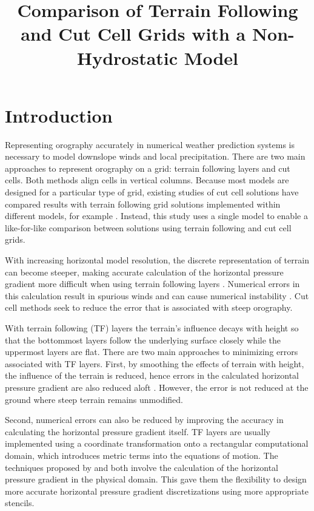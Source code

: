 \documentclass[twocol]{ametsoc}
\title{Comparison of Terrain Following and Cut Cell Grids with a Non-Hydrostatic Model}
\affiliation{}
\begin{document}
\newcommand{\TODO}[1]{\textcolor{purple}{TODO: \emph{#1}}}

\maketitle

\section{Introduction}
Representing orography accurately in numerical weather prediction systems is necessary to model downslope winds and local precipitation.  There are two main approaches to represent orography on a grid: terrain following layers and cut cells.  Both methods align cells in vertical columns.  Because most models are designed for a particular type of grid, existing studies of cut cell solutions have compared results with terrain following grid solutions implemented within different models, for example \citet{good2014}.  Instead, this study uses a single model to enable a like-for-like comparison between solutions using terrain following and cut cell grids.

With increasing horizontal model resolution, the discrete representation of terrain can become steeper, making accurate calculation of the horizontal pressure gradient more difficult when using terrain following layers \citep{gary1973,steppeler2002}.  Numerical errors in this calculation result in spurious winds and can cause numerical instability \citep{fast2003,webster2003}.  Cut cell methods seek to reduce the error that is associated with steep orography.

With terrain following (TF) layers the terrain's influence decays with height so that the bottommost layers follow the underlying surface closely while the uppermost layers are flat.  There are two main approaches to minimizing errors associated with TF layers.  First, by smoothing the effects of terrain with height, the influence of the terrain is reduced, hence errors in the calculated horizontal pressure gradient are also reduced aloft \citep{schaer2002,leuenberger2010,klemp2011}.  However, the error is not reduced at the ground where steep terrain remains unmodified.

Second, numerical errors can also be reduced by improving the accuracy in calculating the horizontal pressure gradient itself.  TF layers are usually implemented using a coordinate transformation onto a rectangular computational domain, which introduces metric terms into the equations of motion.  The techniques proposed by \citet{klemp2011} and \cite{zaengl2012} both involve the calculation of the horizontal pressure gradient in the physical domain.  This gave them the flexibility to design more accurate horizontal pressure gradient discretizations using more appropriate stencils.
\end{document}
